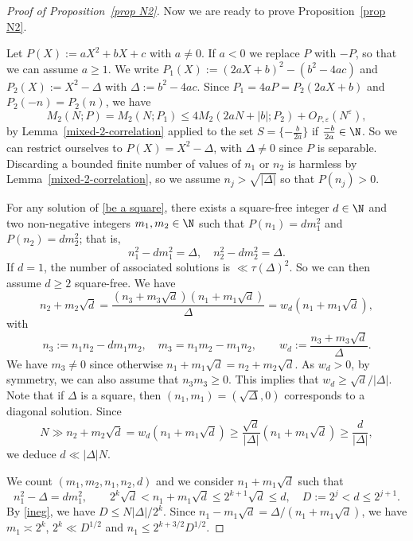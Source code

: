 \documentclass[reqno, 12pt]{amsart}
\theoremstyle{plain}
\theoremstyle{definition}
\theoremstyle{remark}
\renewcommand{\leq}{\leqslant}
\renewcommand{\geq}{\geqslant}
\begin{document}
\begin{proof}[Proof of Proposition~\ref{prop N2}]
\medskip Now we are ready to prove Proposition~\ref{prop N2}.



Let $P(X):=aX^2+bX+c$ with $a\neq 0$. If $a<0$ we replace $P$ with $-P$,
so that we can assume $a\geq 1$. We write $P_1(X):=(2aX+b)^2-(b^2-4ac)$ and $P_2(X):=X^2-\Delta$ with $\Delta:=b^2-4ac$. Since $P_1=4aP=P_2(2aX+b)$ and $P_2(-n) = P_2(n)$, we have
$$M_2(N;P)=M_2(N;P_1)\leq 4M_2(2aN+|b|; P_2) + O_{P,\varepsilon}(N^\varepsilon),$$
by Lemma~\ref{mixed-2-correlation} applied to the set $S = \{-\frac{b}{2a}\}$ if $\frac{-b}{2a}\in \N$.
So we can restrict ourselves to $P(X)=X^2-\Delta$,
     with   $\Delta\neq 0$ since $P$ is separable.
Discarding a bounded finite number of values of $n_1$ or $n_2$ is harmless by Lemma~\ref{mixed-2-correlation}, so we assume $n_j>\sqrt{|\Delta|} $ so that $P(n_j)>0$.
     
For any solution of \eqref{be a square}, there exists a square-free integer $d\in \N$ and two non-negative integers $m_1,m_2\in \N$ such that 
$P(n_1)=dm_1^2$ and $P(n_2)=dm_2^2$; that is,
$$n_1^2-dm_1^2=\Delta,\quad n_2^2-dm_2^2=\Delta.$$ 
If $d=1$, the number of associated solutions is $\ll \tau(\Delta)^2$. So
we can then assume $d\geq 2$ square-free. 
We have
\begin{equation}    
    \label{rapport} n_2+m_2\sqrt d=\frac{ (n_3+m_3\sqrt d)(n_1+m_1\sqrt d)}{\Delta}=w_d(n_1+m_1\sqrt d)
,\end{equation}
with
$$ n_3:=n_1n_2-dm_1m_2, \quad m_3=n_1m_2-m_1n_2,\qquad w_d:=\frac{  n_3+m_3\sqrt d}{\Delta}.$$ 
We have $m_3\neq 0$ since otherwise $n_1 + m_1\sqrt{d}=n_2 +m_2\sqrt{d}.$
As $w_d>0$, by symmetry, we can also assume that $n_3m_3\geq 0.$ This implies that 
$w_d\geq \sqrt{d}/|\Delta|.$
Note that if $\Delta$ is a square, then $(n_1,m_1)=(\sqrt{\Delta},0)$ corresponds to a diagonal solution.
Since \begin{equation}
    \label{ineg}N\gg n_2+m_2\sqrt{d}= w_d(n_1+m_1\sqrt{d})\geq \frac{\sqrt{d}}{|\Delta|}(n_1+m_1\sqrt{d})\geq \frac{ d}{|\Delta|},\end{equation} we deduce $d\ll |\Delta| N.$

We count $(m_1,m_2,n_1,n_2,d)$ and we consider $ n_1+m_1\sqrt{d}$   such that 
$$n_1^2-\Delta=dm_1^2,\qquad 2^k\sqrt{d}<n_1 +m_1 \sqrt{d}\leq 2^{k+1}\sqrt{d}\leq d,\quad D:=2^j<d\leq 2^{j+1}.$$
By \eqref{ineg}, we have $D\leq N|\Delta|/2^k.$
Since $n_1-m_1\sqrt{d} = \Delta/(n_1+m_1\sqrt{d})$,
we have $m_1\asymp 2^k$, $2^k\ll D^{1/2}$ and $n_1\leq 2^{k+3/2}D^{1/2}$.


\end{proof}
\end{document}

